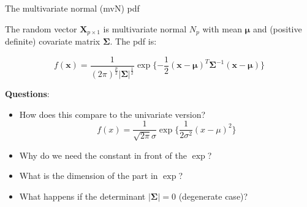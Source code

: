 \documentclass[ignorenonframetext,]{beamer}
\begin{document}
\begin{frame}

\begin{block}{The multivariate normal (mvN) pdf}

\vspace{2mm}

The random vector \(\boldsymbol{X}_{p\times 1}\) is multivariate normal
\(N_p\) with mean \(\boldsymbol{\mu}\) and (positive definite) covariate
matrix \(\boldsymbol\Sigma\). The pdf is:

\[f(\boldsymbol{x})=\frac{1}{(2\pi)^\frac{p}{2}|\boldsymbol\Sigma|^\frac{1}{2}} \exp\{-\frac{1}{2}(\boldsymbol{x}-\boldsymbol{\mu})^T\boldsymbol\Sigma^{-1}(\boldsymbol{x}-\boldsymbol{\mu})\}\]
\(~\)

\textbf{Questions}:

\begin{itemize}
\item
  How does this compare to the univariate version?
  \[f(x)=\frac{1}{\sqrt{2\pi}\sigma}\exp\{ \frac{1}{2\sigma^2}(x-\mu)^2\}\]
\item
  Why do we need the constant in front of the \(\exp\)?
\item
  What is the dimension of the part in \(\exp\)?
\item
  What happens if the determinant \(|\boldsymbol\Sigma| = 0\)
  (degenerate case)? 
\end{itemize}

\end{block}

\end{frame}
\end{document}

